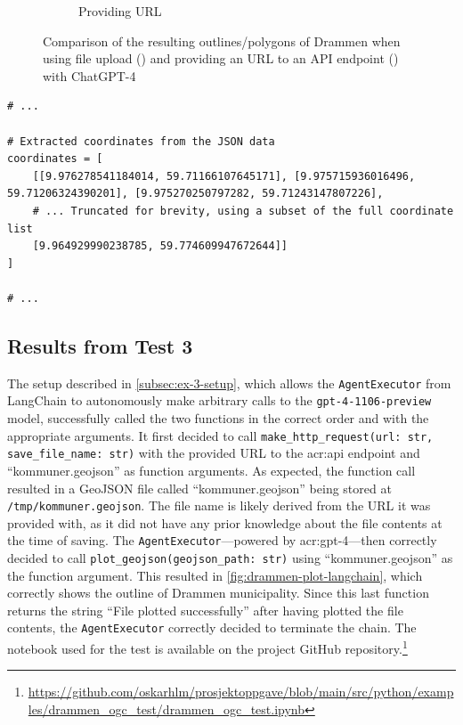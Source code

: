 \begin{figure}
\begin{subfigure}{0.45\textwidth}
        \caption{Providing URL}
        \label{subfig:drammen-outline-api}
    \end{subfigure}
    \caption{Comparison of the resulting outlines/polygons of Drammen when using file upload () and providing an URL to an API endpoint () with ChatGPT-4}
    \label{fig:file-upload-api-comparison}
\end{figure}

\begin{minipage}{\linewidth}
    \begin{lstlisting}[style=python, caption=ChatGPT code that truncates coordinates, label=lst:python-for-failed-drammen-outline]
# ...

# Extracted coordinates from the JSON data
coordinates = [
    [[9.976278541184014, 59.71166107645171], [9.975715936016496, 59.71206324390201], [9.975270250797282, 59.71243147807226], 
    # ... Truncated for brevity, using a subset of the full coordinate list
    [9.964929990238785, 59.774609947672644]]
]

# ...
\end{lstlisting}
\end{minipage}

\subsection{Results from Test 3}\label{subsec:experiment-3-results}

The setup described in \autoref{subsec:ex-3-setup}, which allows the \texttt{AgentExecutor} from LangChain to autonomously make arbitrary calls to the \texttt{gpt-4-1106-preview} model, successfully called the two functions in the correct order and with the appropriate arguments. It first decided to call \texttt{make\_http\_request(url: str, save\_file\_name: str)} with the provided URL to the \acrshort{acr:api} endpoint and \enquote{kommuner.geojson} as function arguments. As expected, the function call resulted in a GeoJSON file called \enquote{kommuner.geojson} being stored at \texttt{/tmp/kommuner.geojson}. The file name is likely derived from the URL it was provided with, as it did not have any prior knowledge about the file contents at the time of saving. The \texttt{AgentExecutor}---powered by \acrshort{acr:gpt}-4---then correctly decided to call \texttt{plot\_geojson(geojson\_path: str)} using \enquote{kommuner.geojson} as the function argument. This resulted in \autoref{fig:drammen-plot-langchain}, which correctly shows the outline of Drammen municipality. Since this last function returns the string \enquote{File plotted successfully} after having plotted the file contents, the \texttt{AgentExecutor} correctly decided to terminate the chain. The notebook used for the test is available on the project GitHub repository.\footnote{\url{https://github.com/oskarhlm/prosjektoppgave/blob/main/src/python/examples/drammen_ogc_test/drammen_ogc_test.ipynb}}


